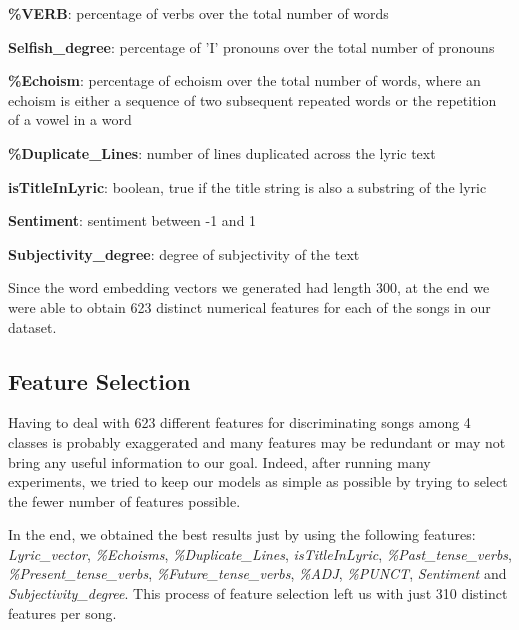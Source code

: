 \begin{description}
\item \textbf{\%VERB}: percentage of verbs over the total number of words
\item \textbf{Selfish\_degree}: percentage of 'I' pronouns over the total number of pronouns
\item \textbf{\%Echoism}: percentage of echoism over the total number of words, where an echoism is either a sequence of two subsequent repeated words or the repetition of a vowel in a word
\item \textbf{\%Duplicate\_Lines}: number of lines duplicated across the lyric text
\item \textbf{isTitleInLyric}: boolean, true if the title string is also a substring of the lyric
\item \textbf{Sentiment}: sentiment between -1 and 1
\item \textbf{Subjectivity\_degree}: degree of subjectivity of the text
\end{description}

Since the word embedding vectors we generated had length 300, at the end we were able to obtain 623 distinct numerical features for each of the songs in our dataset.

\subsection{Feature Selection}

Having to deal with 623 different features for discriminating songs among 4 classes is probably exaggerated and many features may be redundant or may not bring any useful information to our goal. Indeed, after running many experiments, we tried to keep our models as simple as possible by trying to select the fewer number of features possible.

In the end, we obtained the best results just by using the following features: \textit{Lyric\_vector}, \textit{\%Echoisms}, \textit{\%Duplicate\_Lines}, \textit{isTitleInLyric}, \textit{\%Past\_tense\_verbs}, \textit{\%Present\_tense\_verbs}, \textit{\%Future\_tense\_verbs}, \textit{\%ADJ}, \textit{\%PUNCT}, \textit{Sentiment} and \textit{Subjectivity\_degree}. This process of feature selection left us with just 310 distinct features per song.

